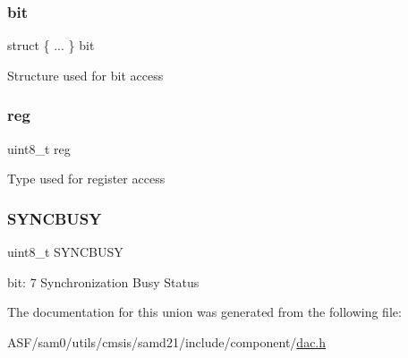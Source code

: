 \subsubsection{\texorpdfstring{bit}{bit}}
{\footnotesize\ttfamily struct \{ ... \}   bit}

Structure used for bit access \mbox{\label{union_d_a_c___s_t_a_t_u_s___type_a9428adc9af4653a2050e2536b55dec8d}} 
\subsubsection{\texorpdfstring{reg}{reg}}
{\footnotesize\ttfamily uint8\+\_\+t reg}

Type used for register access \mbox{\label{union_d_a_c___s_t_a_t_u_s___type_abb30254758e23bd24824e436a1aa8716}} 
\subsubsection{\texorpdfstring{SYNCBUSY}{SYNCBUSY}}
{\footnotesize\ttfamily uint8\+\_\+t S\+Y\+N\+C\+B\+U\+SY}

bit\+: 7 Synchronization Busy Status 

The documentation for this union was generated from the following file\+:\begin{DoxyCompactItemize}
\item 
A\+S\+F/sam0/utils/cmsis/samd21/include/component/\mbox{\hyperlink{component_2dac_8h}{dac.\+h}}\end{DoxyCompactItemize}
